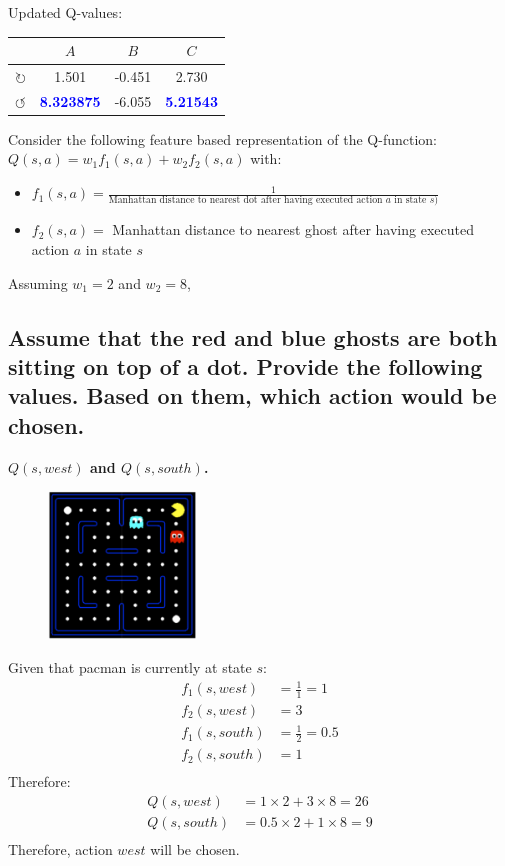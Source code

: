 \documentclass{homework}
\def\clockwise{\circlearrowright}
\def\counterclockwise{\circlearrowleft}
\begin{document}
Updated Q-values:
\begin{table}[h!]
    \centering
    \begin{tabular}{cccc}
        \toprule
        & $A$ & $B$ & $C$ \\
        \midrule
        $\clockwise$ & 1.501 & -0.451 & 2.730 \\
        $\counterclockwise$ & \textbf{\textcolor{blue}{8.323875}} & -6.055 & \textbf{\textcolor{blue}{5.21543}} \\
        \bottomrule
    \end{tabular}
\end{table}

\clearpage
\exercise[7]
Consider the following feature based representation of the Q-function: $Q(s, a) = w_1f_1(s, a) + w_2f_2(s, a)$ with:
\begin{itemize}
    \item $f_1(s, a) = \frac{1}{\text{Manhattan distance to nearest dot after having executed action }a\text{ in state }s)}$
    \item $f_2(s, a) =$ Manhattan distance to nearest ghost after having executed action $a$ in state $s$
\end{itemize}
Assuming $w_1 = 2$ and $w_2 = 8$,

\subsection{Assume that the red and blue ghosts are both sitting on top of a dot. Provide the following values. Based on them, which action would be chosen.}
\textbf{\large $ Q(s, west)$ and $Q(s, south)$.}

\begin{figure}[h!]
    \centering
    \includegraphics[width=0.35\textwidth]{figures/q71.png}
\end{figure}
Given that pacman is currently at state $s$:
\begin{align*}
    f_1(s, west) &= \frac{1}{1} = 1 \\
    f_2(s, west) &= 3 \\
    f_1(s, south) &= \frac{1}{2} = 0.5 \\
    f_2(s, south) &= 1 \\
\end{align*}
Therefore:
\begin{align*}
    Q(s, west) &= 1 \times 2 + 3 \times 8 = 26 \\
    Q(s, south) &= 0.5 \times 2 + 1 \times 8 = 9 \\
\end{align*}
Therefore, action $west$ will be chosen.
\end{document}
